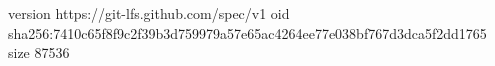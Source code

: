 version https://git-lfs.github.com/spec/v1
oid sha256:7410c65f8f9c2f39b3d759979a57e65ac4264ee77e038bf767d3dca5f2dd1765
size 87536
